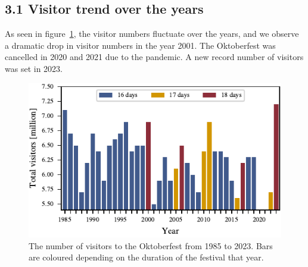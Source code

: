\documentclass{article}
\theoremstyle{plain}
\theoremstyle{definition}
\theoremstyle{remark}
\begin{document}
\subsection*{3.1 Visitor trend over the years}
As seen in figure~\ref{figure_visitors}, the visitor numbers fluctuate over the years, and we observe a dramatic drop in visitor numbers in the year 2001. The Oktoberfest was cancelled in 2020 and 2021 due to the pandemic. A new record number of visitors was set in 2023.
\begin{figure}[ht]%
  \includegraphics{fig/totalvisitors.pdf}
  \caption{The number of visitors to the Oktoberfest from 1985 to 2023. Bars are coloured depending on the duration of the festival that year.}
  \label{figure_visitors}
\end{figure}
\end{document}
